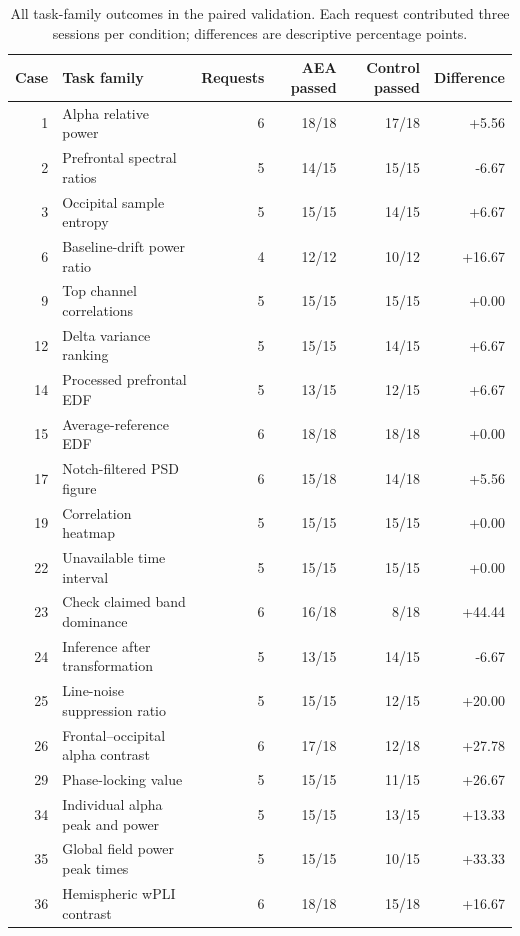 \begin{table}[!htbp]
\centering\footnotesize
\caption{All task-family outcomes in the paired validation. Each request contributed three sessions per condition; differences are descriptive percentage points.}
\label{tab:paired-families}
\begin{tabular}{r>{\raggedright\arraybackslash}p{6.0cm}rrrr}
\toprule
Case & Task family & Requests & AEA passed & Control passed & Difference \\
\midrule
1 & Alpha relative power & 6 & 18/18 & 17/18 & +5.56 \\
2 & Prefrontal spectral ratios & 5 & 14/15 & 15/15 & -6.67 \\
3 & Occipital sample entropy & 5 & 15/15 & 14/15 & +6.67 \\
6 & Baseline-drift power ratio & 4 & 12/12 & 10/12 & +16.67 \\
9 & Top channel correlations & 5 & 15/15 & 15/15 & +0.00 \\
12 & Delta variance ranking & 5 & 15/15 & 14/15 & +6.67 \\
14 & Processed prefrontal EDF & 5 & 13/15 & 12/15 & +6.67 \\
15 & Average-reference EDF & 6 & 18/18 & 18/18 & +0.00 \\
17 & Notch-filtered PSD figure & 6 & 15/18 & 14/18 & +5.56 \\
19 & Correlation heatmap & 5 & 15/15 & 15/15 & +0.00 \\
22 & Unavailable time interval & 5 & 15/15 & 15/15 & +0.00 \\
23 & Check claimed band dominance & 6 & 16/18 & 8/18 & +44.44 \\
24 & Inference after transformation & 5 & 13/15 & 14/15 & -6.67 \\
25 & Line-noise suppression ratio & 5 & 15/15 & 12/15 & +20.00 \\
26 & Frontal--occipital alpha contrast & 6 & 17/18 & 12/18 & +27.78 \\
29 & Phase-locking value & 5 & 15/15 & 11/15 & +26.67 \\
34 & Individual alpha peak and power & 5 & 15/15 & 13/15 & +13.33 \\
35 & Global field power peak times & 5 & 15/15 & 10/15 & +33.33 \\
36 & Hemispheric wPLI contrast & 6 & 18/18 & 15/18 & +16.67 \\
\bottomrule
\end{tabular}
\end{table}

